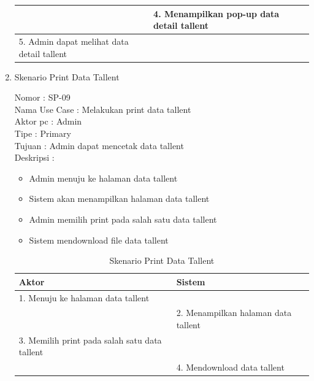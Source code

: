 \begin{enumerate}
\begin{table}
\begin{tabular}{ |  p{50mm} | p{70mm} |}
		& 4.	Menampilkan pop-up data detail tallent \\
		
		\hline
		
		5.	Admin dapat melihat data detail tallent  & \\
		\hline
		
		
	\end{tabular}
\end{table}

\newpage
\item Skenario Print Data Tallent

Nomor \kern 3.6pc : SP-09 \\
Nama Use Case : Melakukan print data tallent \\
Aktor  pc : Admin \\
Tipe \kern 4.6pc : Primary \\
Tujuan \kern 3.6pc : Admin dapat mencetak data tallent \\
Deskripsi \kern 2.5pc : 

\begin{itemize}
	\item Admin menuju ke halaman data tallent
	\item Sistem akan menampilkan halaman data tallent
	\item Admin memilih print pada salah satu data tallent
	\item Sistem mendownload file data tallent
	
\end{itemize}

\begin{table}
	\caption{Skenario Print Data Tallent}
	\centering
	\begin{tabular}{ | p{50mm} | p{70mm} |}
		\hline 
		\textbf{Aktor} & \textbf{Sistem} \\
		\hline
		
		1.	Menuju ke halaman data tallent &  \\
		
		\hline
		
		&  2.	Menampilkan halaman data tallent \\
		
		\hline
		
		3. Memilih print pada salah satu data tallent & \\
		
		\hline
		
		& 4.	Mendownload data tallent \\
		

\end{tabular}
\end{table}
\end{enumerate}
